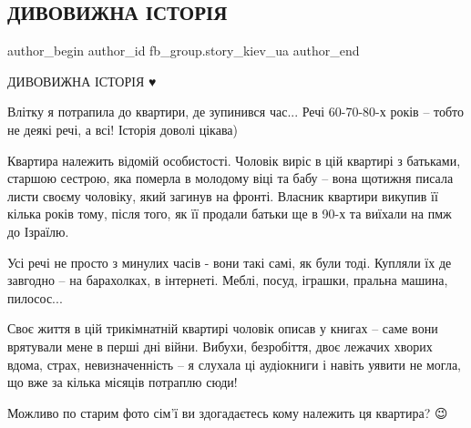  
 
 
 
 

\subsection{ДИВОВИЖНА ІСТОРІЯ}
\label{sec:08_01_2023.fb.fb_group.story_kiev_ua.1.divovizhna__stor_ya}

\ifcmt
 author_begin
   author_id fb_group.story_kiev_ua
 author_end
\fi

ДИВОВИЖНА ІСТОРІЯ ♥️

Влітку я потрапила до квартири, де зупинився час... Речі 60-70-80-х років –
тобто не деякі речі, а всі! Історія доволі цікава)

Квартира належить відомій особистості. Чоловік виріс в цій квартирі з батьками,
старшою сестрою, яка померла в молодому віці та бабу – вона щотижня писала
листи своєму чоловіку, який загинув на фронті. Власник квартири викупив її
кілька років тому, після того, як її продали батьки ще в 90-х та виїхали на пмж
до Ізраїлю.

Усі речі не просто з минулих часів - вони такі самі, як були тоді. Купляли їх
де завгодно – на барахолках, в інтернеті. Меблі, посуд, іграшки, пральна
машина, пилосос... 

Своє життя в цій трикімнатній квартирі чоловік описав у книгах – саме вони
врятували мене в перші дні війни. Вибухи, безробіття, двоє лежачих хворих
вдома, страх, невизначенність – я слухала ці аудіокниги і навіть уявити не
могла, що вже за кілька місяців потраплю сюди!

Можливо по старим фото сім'ї ви здогадаєтесь кому належить ця квартира? 😉
